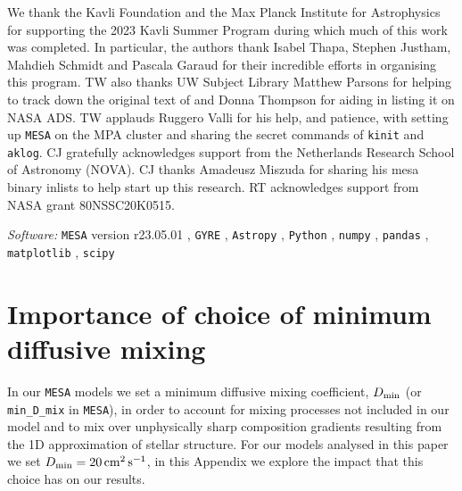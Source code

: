 \documentclass[desactivate]{aa}
\begin{document}
\begin{acknowledgements}
    We thank the Kavli Foundation and the Max Planck Institute for Astrophysics for supporting the 2023 Kavli Summer Program during which much of this work was completed. In particular, the authors thank Isabel Thapa, Stephen Justham, Mahdieh Schmidt and Pascala Garaud for their incredible efforts in organising this program. TW also thanks UW Subject Library Matthew Parsons for helping to track down the original text of \citet{BVF-vaisala} and Donna Thompson for aiding in listing it on NASA ADS. TW applauds Ruggero Valli for his help, and patience, with setting up \texttt{MESA} on the MPA cluster and sharing the secret commands of \texttt{kinit} and \texttt{aklog}. CJ gratefully acknowledges support from the Netherlands Research School of Astronomy (NOVA). CJ thanks Amadeusz Miszuda for sharing his {\sc mesa} {\sc binary} inlists to help start up this research. RT acknowledges support from NASA grant 80NSSC20K0515.
\end{acknowledgements}

\textit{Software:} \texttt{MESA} \citep{Paxton2011, Paxton2013, Paxton2015, Paxton2018, Paxton2019, Jermyn2023} version r23.05.01 \citep{mesa_zenodo}, \texttt{GYRE} \citep{Townsend+2013, Townsend+2018}, \texttt{Astropy} \citep{astropy:2013, astropy:2018, astropy:2022}, \texttt{Python} \citep{python}, \texttt{numpy} \citep{numpy}, \texttt{pandas} \citep{pandas_1.4.2, pandas_paper}, \texttt{matplotlib} \citep{matplotlib}, \texttt{scipy} \citep{Virtanen+2020}




\restartappendixnumbering

\allowdisplaybreaks
\appendix

\section{Importance of choice of minimum diffusive mixing}\label{app:min_D_mix}

In our \texttt{MESA} models we set a minimum diffusive mixing coefficient, $D_{\rm min}$ (or \texttt{min\_D\_mix} in \texttt{MESA}), in order to account for mixing processes not included in our model and to mix over unphysically sharp composition gradients resulting from the 1D approximation of stellar structure. For our models analysed in this paper we set $D_{\rm min} = 20 \,{\rm cm^2 \, s^{-1}}$, in this Appendix we explore the impact that this choice has on our results.
\end{document}
